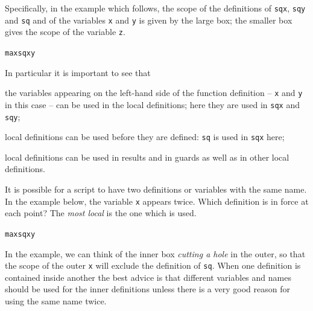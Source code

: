 Specifically, in the example which follows, the scope of the
definitions of \texttt{sqx}, \texttt{sqy} and \texttt{sq} and of the variables \texttt{x}
and \texttt{y} is given by the large box; the smaller box gives the scope of the
variable \texttt{z}.
\begin{alltt}
maxsq x y 
\bl
\end{alltt}
In particular it is important to see that
\begin{titemize}
\item the variables appearing on the left-hand side of the function 
definition --
\texttt{x} and \texttt{y} in this case -- can be used in the local definitions; here they are
used in \texttt{sqx} and \texttt{sqy}; 
\item local definitions can be used before they are defined: \texttt{sq} is used
in \texttt{sqx} here;
\item local definitions can be used in results and in guards as well as in
other local definitions.
\end{titemize}
It is possible for a script to have two definitions or variables with the
same name. In the example below, the variable \texttt{x} appears twice. Which
definition is in force at each point? The {\em most local\/} is the one which
is used. 
\begin{alltt}
maxsq x y 
\bl
\end{alltt}
In the example, we can think of the inner box {\em cutting a hole\/} in the
outer, so that the scope of the outer \texttt{x} will exclude the 
definition of \texttt{sq}. When one
definition is contained inside another the best advice is that different
variables and names should be used for the inner definitions unless there is a
very good reason for using the same name twice.

